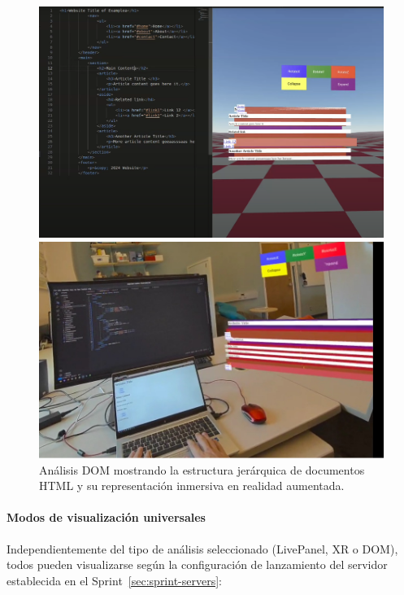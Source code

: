 \documentclass[a4paper, 12pt]{book}
\begin{document}
\begin{figure}[H]
\centering
\begin{minipage}[b]{0.48\textwidth}
\centering
\includegraphics[width=\textwidth]{img/dom-analisis-html.png}
\end{minipage}
\hfill
\begin{minipage}[b]{0.48\textwidth}
\centering
\includegraphics[width=\textwidth]{img/dom-experiencia-ar.png}
\end{minipage}
\caption{Análisis DOM mostrando la estructura jerárquica de documentos HTML y su representación inmersiva en realidad aumentada.}
\label{fig:dom-analisis}
\end{figure}

\paragraph{Modos de visualización universales}
Independientemente del tipo de análisis seleccionado (LivePanel, XR o DOM), todos pueden visualizarse según la configuración de lanzamiento del servidor establecida en el Sprint~\ref{sec:sprint-servers}:
\end{document}
